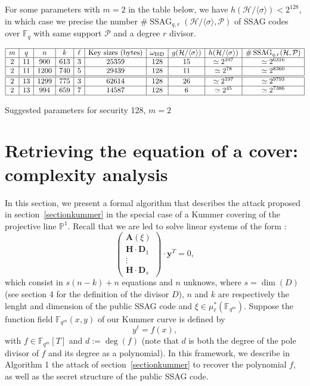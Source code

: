 \documentclass[10pt]{article}
\theoremstyle{definition}
\theoremstyle{definition}
\theoremstyle{definition}
\newcommand{\cd}{\cdot}
\newcommand{\PP}{\mathbb{P}}
\newcommand{\calH}{\mathcal{H}}
\newcommand{\fqm}{\mathbb{F}_{q^m}}
\newcommand{\fq}{\mathbb{F}_q}
\newcommand{\w}{\omega}
\newcommand{\PR}{\mathcal{P}}
\newcommand{\ssag}{\operatorname{SSAG}}
\begin{document}
For some parameters with $m=2$ in the table below, we have $h(\calH/\langle \sigma \rangle) < 2^{128}$, in which case we precise the number $\#\ssag_{q,r}(\calH/\langle \sigma \rangle,\PR)$ of SSAG codes over $\fq$ with same support $\PR$ and a degree $r$ divisor.

\begin{table}[htbp]
\begin{equation*}
\begin{array}{|c|c|c|c|c|c|c|c|c|c|}
\hline
m & q  & n & k & \ell &\mathrm{Key} \ \mathrm{sizes} \ (\mathrm{bytes}) & \w_{\mathrm{ISD}} & g(\calH/\langle \sigma \rangle) & h(\calH/\langle \sigma \rangle) & \#\ssag_{q,r}(\mathcal{H},\PR)  \\
\hline
2 & 11  & 900 & 613 & 3 & 25359 & 128 & 15 & \simeq 2^{107} & \simeq 2^{6316} \\
\hline
2 & 11  & 1200 & 740 & 5 & 29439 & 128 & 11 & \simeq 2^{78} & \simeq 2^{8360}\\
\hline \hline
2 & 13  & 1299 & 775 & 3 & 62614 & 128 & 26 & \simeq 2^{197} & \simeq 2^{9793}\\
\hline
2 & 13 & 994 & 659 & 7 & 14587 & 128 & 6 & \simeq 2^{45} & \simeq 2^{7386}\\
\hline
\end{array}
\end{equation*}
\caption{Suggested parameters for security 128, $m = 2$}
\end{table}

\newpage


\appendix


\section{Retrieving the equation of a cover: complexity analysis} \label{annexA}


In this section, we present a formal algorithm that describes the attack proposed in section~\ref{sectionkummer} in the special case of a Kummer covering of the projective line $\PP^1$. Recall that we are led to solve linear systems of the form :
\begin{equation} \tag{$\Delta(\xi)$}
\begin{pmatrix}
\mathbf{A}(\xi) \\
\mathbf{H} \cd \textbf{D}_1 \\
\vdots \\
\mathbf{H} \cd \textbf{D}_s
\end{pmatrix}
\cd \textbf{y}^T = 0,
\end{equation}
which consist in $s(n-k)+n$ equations and $n$ unknows, where $s=\dim(D)$ (see section 4 for the definition of the divisor $D$), $n$ and $k$ are respectively the lenght and dimension of the public SSAG code and $\xi \in \mu_{\ell}^*(\fqm)$. Suppose the function field $\fqm(x,y)$ of our Kummer curve is defined by
\[y^{\ell} = f(x),\]
with $f \in \fqm[T]$ and $d:=\deg(f)$ (note that $d$ is both the degree of the pole divisor of $f$ and its degree as a polynomial). In this framework, we describe in Algorithm 1 the attack of section~\ref{sectionkummer} to recover the polynomial $f$, as well as the secret structure of the public SSAG code.
\end{document}
